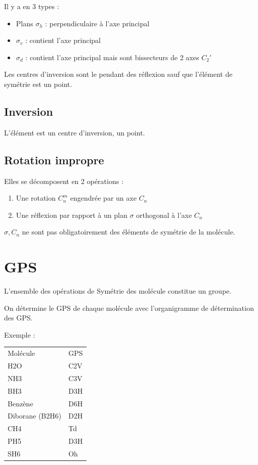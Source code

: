\documentclass[french]{yLectureNote}
\begin{document}
Il y a en 3 types :
\begin{itemize}
 \item Plans \(\sigma_h\) : perpendiculaire à l'axe principal
 \item \(\sigma_v\) : contient l'axe principal
 \item \(\sigma_d\) : contient l'axe principal mais sont bissecteurs de 2 axes \(C_2'\)
\end{itemize}
Les centres d'inversion sont le pendant des réflexion sauf que l'élément de symétrie est un point.
\subsection{Inversion}
L'élément est un centre d'inversion, un point.
\subsection{Rotation impropre}
\begin{definition}Elles se décomposent en 2 opérations :
\begin{enumerate}
 \item Une rotation \(C_n^m\) engendrée par un axe \(C_n\)
 \item Une réflexion par rapport à un plan \(\sigma\) orthogonal à l'axe \(C_n\)
\end{enumerate}
\(\sigma, C_n\) ne sont pas obligatoirement des éléments de symétrie de la molécule.
\end{definition}
\section{GPS}
L'ensemble des opérations de Symétrie des molécule constitue un groupe.

On détermine le GPS de chaque molécule avec l'organigramme de détermination des GPS.

Exemple : \begin{center}
\begin{tabular}{ll}
Molécule & GPS\\
H2O & C2V\\
NH3 & C3V\\
BH3 & D3H\\
Benzène & D6H\\
Diborane (B2H6) & D2H\\
CH4 & Td\\
PH5 & D3H\\
SH6 & Oh
          \end{tabular}
          \end{center}
\end{document}
